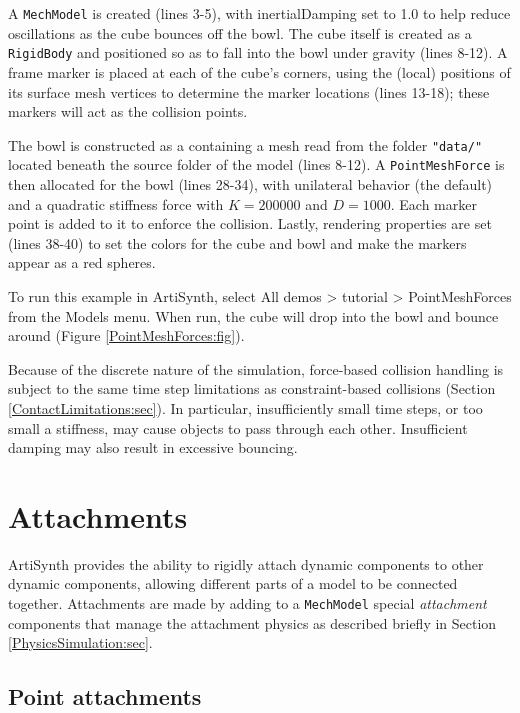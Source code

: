 A {\tt MechModel} is created (lines 3-5), with {\sf inertialDamping} set to 1.0
to help reduce oscillations as the cube bounces off the bowl. The cube itself
is created as a {\tt RigidBody} and positioned so as to fall into the bowl
under gravity (lines 8-12). A frame marker is placed at each of the cube's
corners, using the (local) positions of its surface mesh vertices to determine
the marker locations (lines 13-18); these markers will act as the collision
points.

The bowl is constructed as a  containing a mesh
read from the folder {\tt "data/"} located beneath the source folder of the
model (lines 8-12). A {\tt PointMeshForce} is then allocated for the bowl
(lines 28-34), with unilateral behavior (the default) and a quadratic stiffness
force with $K = 200000$ and $D = 1000$. Each marker point is added to it to
enforce the collision. Lastly, rendering properties are set (lines 38-40) to
set the colors for the cube and bowl and make the markers appear as a red
spheres.

To run this example in ArtiSynth, select {\sf All demos > tutorial >
PointMeshForces} from the {\sf Models} menu. When run, the cube will drop into
the bowl and bounce around (Figure \ref{PointMeshForces:fig}).

\begin{sideblock}
Because of the discrete nature of the simulation, force-based collision
handling is subject to the same time step limitations as constraint-based
collisions (Section \ref{ContactLimitations:sec}). In particular,
insufficiently small time steps, or too small a stiffness, may cause objects to
pass through each other. Insufficient damping may also result
in excessive bouncing.
\end{sideblock}

\section{Attachments}
\label{Attachments:sec}

ArtiSynth provides the ability to rigidly attach dynamic components to other
dynamic components, allowing different parts of a model to be connected
together.  Attachments are made by adding to a {\tt MechModel} special {\it
attachment} components that manage the attachment physics as described briefly
in Section
\ref{PhysicsSimulation:sec}.

\subsection{Point attachments}
\label{sec:mech:pointattachments}

